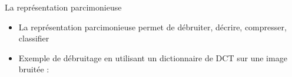 \begin{frame}{La représentation parcimonieuse}
\begin{itemize}
\item La représentation parcimonieuse permet de débruiter, décrire, compresser, classifier
\item Exemple de débruitage en utilisant un dictionnaire de DCT sur une image bruitée :
	\begin{figure}\centering
	\end{figure}
\end{itemize}
\end{frame}


